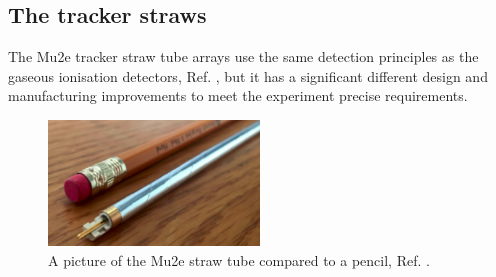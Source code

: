 \subsection{The tracker straws}

The Mu2e tracker straw tube arrays use the same detection principles as the gaseous 
ionisation detectors, Ref. \cite{kola}, 
but it has a significant different design and manufacturing improvements to 
meet the experiment precise requirements.
\begin{figure}[!h]
    \centering
    \includegraphics[width =0.5\textwidth]{figures/png/Screenshot_20240327_000000.png}
    \caption{A picture of the Mu2e straw tube
    compared to a pencil, Ref. \cite{trk}.}
    \label{fig:trkpencil}
    \end{figure}

